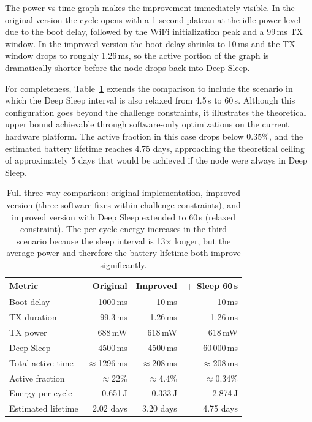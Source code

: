 \documentclass[a4paper,11pt]{article}
\begin{document}
The power-vs-time graph makes the improvement immediately visible. In the original
version the cycle opens with a 1-second plateau at the idle power level due to the
boot delay, followed by the WiFi initialization peak and a 99\,ms TX window. In the
improved version the boot delay shrinks to 10\,ms and the TX window drops to roughly
1.26\,ms, so the active portion of the graph is dramatically shorter before the node
drops back into Deep Sleep.
 
For completeness, Table~\ref{tab:full_summary} extends the comparison to include the
scenario in which the Deep Sleep interval is also relaxed from 4.5\,s to 60\,s.
Although this configuration goes beyond the challenge constraints, it illustrates the
theoretical upper bound achievable through software-only optimizations on the current
hardware platform. The active fraction in this case drops below 0.35\%, and the
estimated battery lifetime reaches 4.75 days, approaching the theoretical ceiling of approximately 5 days that would be achieved if the node were always in Deep Sleep.
 
\begin{table}[H]
\centering
\begin{tabular}{lrrr}
\toprule
\textbf{Metric} & \textbf{Original} & \textbf{Improved} & \textbf{+ Sleep 60\,s} \\
\midrule
Boot delay             & 1000\,ms   & 10\,ms     & 10\,ms     \\
TX duration            & 99.3\,ms   & 1.26\,ms   & 1.26\,ms   \\
TX power               & 688\,mW    & 618\,mW    & 618\,mW    \\
Deep Sleep             & 4500\,ms   & 4500\,ms   & 60\,000\,ms \\
\midrule
Total active time      & $\approx$1296\,ms & $\approx$208\,ms & $\approx$208\,ms \\
Active fraction        & $\approx$22\%     & $\approx$4.4\%   & $\approx$0.34\%  \\
\midrule
Energy per cycle       & 0.651\,J   & 0.333\,J   & 2.874\,J   \\
Estimated lifetime     & 2.02 days  & 3.20 days  & 4.75 days  \\
\bottomrule
\end{tabular}
\caption{Full three-way comparison: original implementation, improved version
(three software fixes within challenge constraints), and improved version with
Deep Sleep extended to 60\,s (relaxed constraint). The per-cycle energy increases
in the third scenario because the sleep interval is 13$\times$ longer, but the
average power and therefore the battery lifetime both improve significantly.}
\label{tab:full_summary}
\end{table}
 
\end{document}

